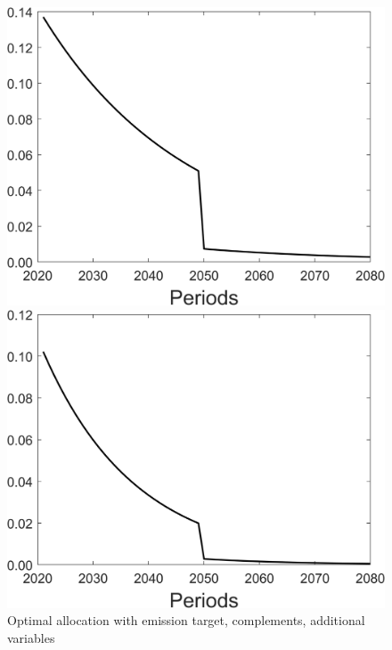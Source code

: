 \begin{figure}[h!!]
	\centering
	\caption{Optimal allocation with emission target, complements, additional variables }\label{fig:optallo_comp_onlyR_add}
	\begin{minipage}[]{0.32\textwidth}
	\includegraphics[width=1\textwidth]{../../codding_model/Own/figures/Rep_agent/staticonlyRam_separate_Lc_periods59_eppsilon0.40_zeta1.40_Ad08_Ac04_thetac0.70_thetad0.56_HetGrowth1_tauul0.181_util0_withtarget1_lgd0.png}
\end{minipage}
	\begin{minipage}[]{0.32\textwidth}
		\includegraphics[width=1\textwidth]{../../codding_model/Own/figures/Rep_agent/staticonlyRam_separate_Ld_periods59_eppsilon0.40_zeta1.40_Ad08_Ac04_thetac0.70_thetad0.56_HetGrowth1_tauul0.181_util0_withtarget1_lgd0.png}

\end{minipage}
\end{figure}

